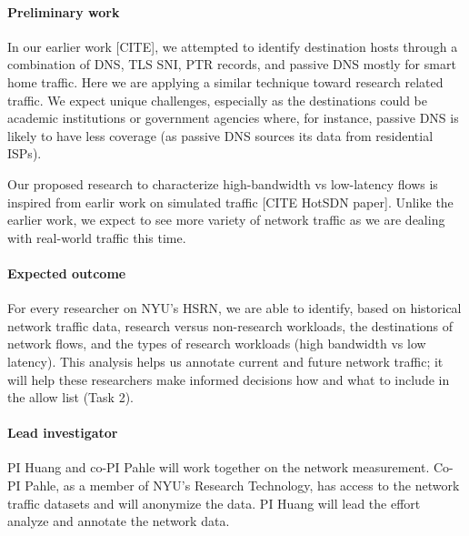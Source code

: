 \paragraph{Preliminary work}
In our earlier work [CITE], we attempted to identify destination hosts through a combination of DNS, TLS SNI, PTR records, and passive DNS mostly for smart home traffic. Here we are applying a similar technique toward research related traffic. We expect unique challenges, especially as the destinations could be academic institutions or government agencies where, for instance, passive DNS is likely to have less coverage (as passive DNS sources its data from residential ISPs).

Our proposed research to characterize high-bandwidth vs low-latency flows is inspired from earlir work on simulated traffic [CITE HotSDN paper]. Unlike the earlier work, we expect to see more variety of network traffic as we are dealing with real-world traffic this time.


\paragraph{Expected outcome}
For every researcher on NYU's HSRN, we are able to identify, based on historical network traffic data, research versus non-research workloads, the destinations of network flows, and the types of research workloads (high bandwidth vs low latency). This analysis helps us annotate current and future network traffic; it will help these researchers make informed decisions how and what to include in the allow list (Task 2).

\paragraph{Lead investigator} PI Huang and co-PI Pahle will work together on the network measurement. Co-PI Pahle, as a member of NYU's Research Technology, has access to the network traffic datasets and will anonymize the data. PI Huang will lead the effort analyze and annotate the network data.
